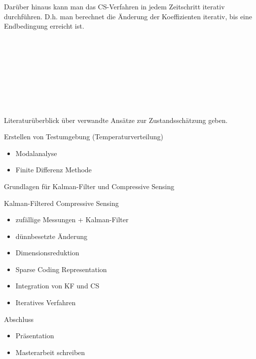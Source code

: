 \documentclass [a4paper, 10pt]{scrartcl}
\begin{document}
Darüber hinaus kann man das CS-Verfahren in jedem Zeitschritt iterativ durchführen. D.h. man berechnet die Änderung der Koeffizienten iterativ, bis eine Endbedingung erreicht ist. 
\\
\\
\\
\\
\\
\\
\\
\\
\\

\begin{aufgaben}
\item Literaturüberblick über verwandte Ansätze zur Zustandsschätzung geben.
\item Erstellen von Testumgebung (Temperaturverteilung)
  \begin{itemize}
  \item Modalanalyse
  \item Finite Differenz Methode
  \end{itemize}
\item Grundlagen für Kalman-Filter und Compressive Sensing
\item Kalman-Filtered Compressive Sensing
  \begin{itemize}
  \item zufällige Messungen + Kalman-Filter
  \item dünnbesetzte Änderung
  \item Dimensionsreduktion
  \item Sparse Coding Representation
  \item Integration von KF und CS
  \item Iteratives Verfahren
  \end{itemize}
\item Abschluss
  \begin{itemize}
  \item Präsentation
  \item Masterarbeit schreiben
  \end{itemize}
\end{aufgaben}%
\Ende
\end{document}
